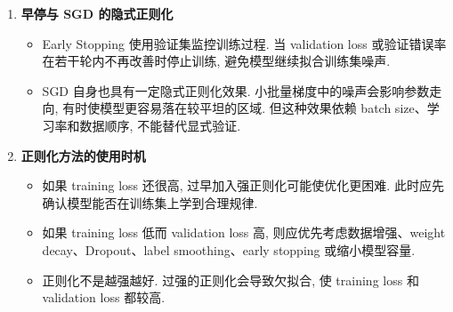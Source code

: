 \documentclass{../nndlcourse}
\begin{document}
\begin{enumerate}
\begin{itemize}
\[        =
        \frac{h_i}{q}\mathbb{E}[m_i]
        =
        h_i.
      \]
      合在一起就是 $\mathbb{E}[\tilde{\boldsymbol{h}}\mid\boldsymbol{h}]=\boldsymbol{h}$. 如果训练时不除以 $q$, 则期望会变成 $q\boldsymbol{h}$, 推理阶段就需要再乘以 $q$ 或做相应尺度修正. Inverted dropout 把这个尺度修正放在训练阶段完成, 因而推理阶段关闭 Dropout 后可以直接使用完整激活. 需要注意, 这个结论只保证当前层被丢弃后激活的逐坐标期望不变; 经过后续非线性层后, 整个网络输出的期望不一定严格等于无 Dropout 网络的输出.
      \item Dropout 的直观作用是让网络不能过度依赖某些局部神经元组合, 从而降低共适应 (co-adaptation). 如果某个神经元承载了过多信息, 随机丢弃会迫使其他路径也学习可用表示, 使模型对局部扰动更稳定.
      \item 从集成学习角度看, 每次丢弃都相当于从原网络中采样一个子网络. 若有 $d$ 个可丢弃单元, 理论上存在多达 $2^d$ 个掩码模式. 推理阶段使用完整网络和尺度校正, 可看作对这些子网络预测的一种廉价近似.
      \item 从贝叶斯近似角度看, Dropout 也可理解为对参数或子网络掩码的随机采样. 若显式做 Monte Carlo Dropout, 可用多次采样近似
      \[
        \mathbb{E}_{q(\boldsymbol{\theta})}
        \left[f(\boldsymbol{x};\boldsymbol{\theta})\right]
        \approx
        \frac{1}{M}\sum_{m=1}^{M}
        f(\boldsymbol{x};\boldsymbol{\theta}_m).
      \]
      更重要的是把它理解为训练阶段的随机正则化, 不必把每次普通推理都解释成真实的贝叶斯积分.
      \item 在循环神经网络中, 若每个时间步都重新采样不同的丢弃掩码, 可能破坏时间维度上的记忆. 因此常使用 locked dropout 或 variational dropout: 对同一序列在所有时间步复用同一个掩码, 使采样到的子网络在时间展开中保持一致.
      \item 推理阶段通常关闭 Dropout, 使用完整网络. 这体现了训练和推理行为的差异, 与 Batch Normalization 类似都需要在实现中明确区分模式.
    \end{itemize}
  \item \textbf{早停与 SGD 的隐式正则化}
    \begin{itemize}
      \item Early Stopping 使用验证集监控训练过程. 当 validation loss 或验证错误率在若干轮内不再改善时停止训练, 避免模型继续拟合训练集噪声.
      \item SGD 自身也具有一定隐式正则化效果. 小批量梯度中的噪声会影响参数走向, 有时使模型更容易落在较平坦的区域. 但这种效果依赖 batch size、学习率和数据顺序, 不能替代显式验证.
    \end{itemize}
  \item \textbf{正则化方法的使用时机}
    \begin{itemize}
      \item 如果 training loss 还很高, 过早加入强正则化可能使优化更困难. 此时应先确认模型能否在训练集上学到合理规律.
      \item 如果 training loss 低而 validation loss 高, 则应优先考虑数据增强、weight decay、Dropout、label smoothing、early stopping 或缩小模型容量.
      \item 正则化不是越强越好. 过强的正则化会导致欠拟合, 使 training loss 和 validation loss 都较高.
    \end{itemize}
\end{enumerate}
\end{document}
